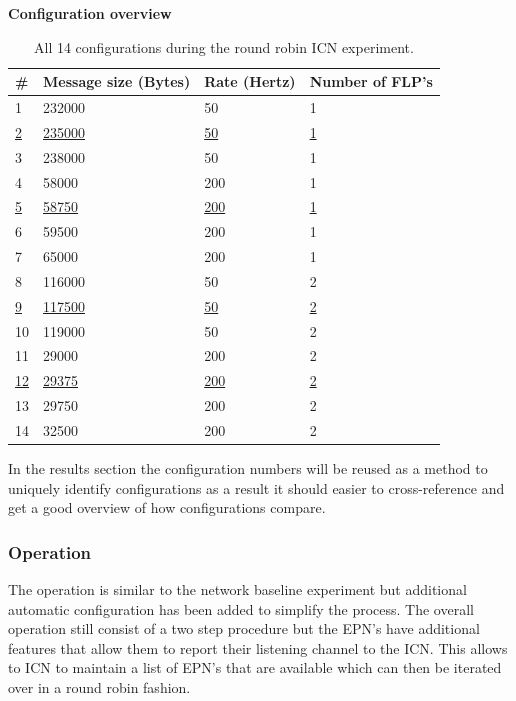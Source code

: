 \documentclass[]{article}
\begin{document}
\begin{table}[H]
	\textbf{Configuration overview}	
	\begin{center}
		\begin{tabular}{ | l | l | l | l | }
			\hline
			\textbf{\#} & \textbf{Message size (Bytes)} & \textbf{Rate (Hertz)} & \textbf{Number of FLP’s} \\ \hline
			
			1 & 232000 & 50 & 1 \\ \hline
			\underline{2} & \underline{235000} & \underline{50} & \underline{1} \\ \hline
			3 & 238000 & 50 & 1 \\ \hline
			4 & 58000 & 200 & 1 \\ \hline
			\underline{5} & \underline{58750} & \underline{200} & \underline{1} \\ \hline
			6 & 59500 & 200 & 1 \\ \hline
			7 & 65000 & 200 & 1 \\ \hline
			8 & 116000 & 50 & 2 \\ \hline
			\underline{9} & \underline{117500} & \underline{50} & \underline{2} \\ \hline
			10 & 119000 & 50 & 2 \\ \hline
			11 & 29000 & 200 & 2 \\ \hline
			\underline{12} & \underline{29375} & \underline{200} & \underline{2} \\ \hline
			13 & 29750 & 200 & 2 \\ \hline
			14 & 32500 & 200 & 2 \\ \hline
		\end{tabular}
		\caption{All 14 configurations during the round robin ICN experiment.}
		\label{tab:specs}
	\end{center}
\end{table}

In the results section the configuration numbers will be reused as a method to uniquely identify configurations as a result it should easier to cross-reference and get a good overview of how configurations compare.


\subsubsection{Operation}
The operation is similar to the network baseline experiment but additional automatic configuration has been added to simplify the process. The overall operation still consist of a two step procedure but the EPN’s have additional features that allow them to report their listening channel to the ICN. This allows to ICN to maintain a list of EPN’s that are available which can then be iterated over in a round robin fashion.
\end{document}

